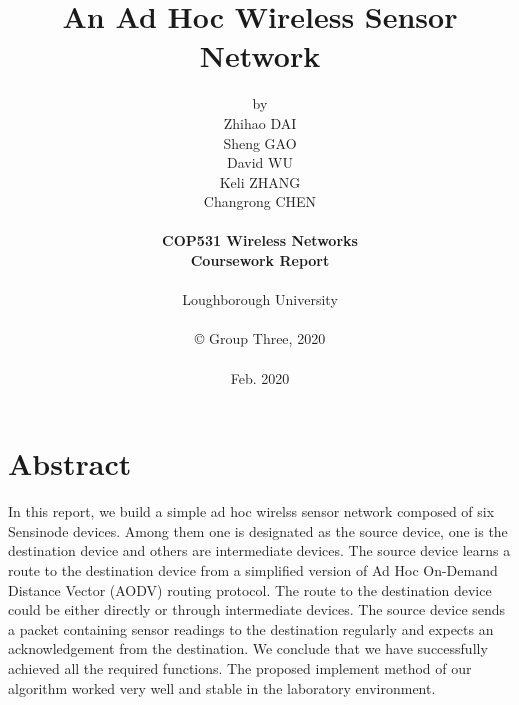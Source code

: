 \title{\bf An Ad Hoc Wireless Sensor Network}

\author{by\\
Zhihao DAI\\
Sheng GAO\\
David WU\\
Keli ZHANG\\
Changrong CHEN\\
\\
{\bf COP531 Wireless Networks}\\
{\bf Coursework Report}\\
\\
Loughborough University\\
\\
\copyright
\hspace{1 dd} Group Three, 2020\\
\\
Feb. 2020
}
\date{} %

\maketitle


% 
% 

\chapter*{Abstract}
In this report, we build a simple ad hoc wirelss sensor network composed of six Sensinode devices.
Among them one is designated as the source device, one is the destination device and others are intermediate devices.
The source device learns a route to the destination device from a simplified version of Ad Hoc On-Demand Distance Vector (AODV) routing protocol.
The route to the destination device could be either directly or through intermediate devices.
The source device sends a packet containing sensor readings to the destination regularly and expects an acknowledgement from the destination.
We conclude that we have successfully achieved all the required functions. The proposed implement method of our algorithm worked very well and stable in the laboratory environment.

